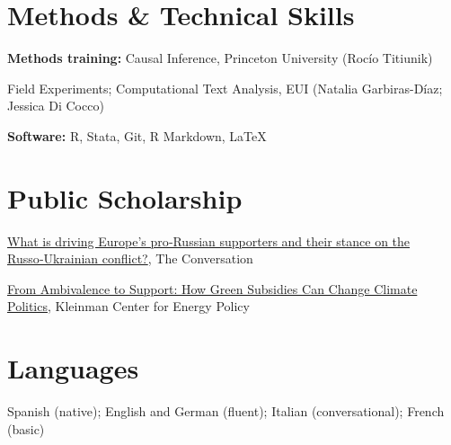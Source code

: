 \documentclass[11pt,a4paper]{article}
\newcommand{\dateditem}[2]{%
  \noindent
  \begin{minipage}[t]{0.80\linewidth}\vspace{0pt}\raggedright #1\end{minipage}\hfill%
  \begin{minipage}[t]{0.18\linewidth}\vspace{0pt}\raggedleft{\color{muted}#2}\end{minipage}\par
}
\newcommand{\simpleitem}[2]{%
  \dateditem{#1}{#2}\vspace{0.08em}
}
\begin{document}
\section{Methods \& Technical Skills}

\simpleitem{\textbf{Methods training:} Causal Inference, Princeton University (Roc\'io Titiunik)}{2024}
\simpleitem{Field Experiments; Computational Text Analysis, EUI (Natalia Garbiras-D\'iaz; Jessica Di Cocco)}{2023}
\textbf{Software:} R, Stata, Git, R Markdown, \LaTeX


\section{Public Scholarship}

\simpleitem{\href{https://theconversation.com/what-is-driving-europes-pro-russian-supporters-and-their-stance-on-the-russo-ukrainian-conflict-281598}{What is driving Europe's pro‑Russian supporters and their stance on the Russo‑Ukrainian conflict?}, The Conversation}{2026}
\simpleitem{\href{https://kleinmanenergy.upenn.edu/commentary/blog/insights-from-the-the-political-economy-of-climate-change-and-the-environment-2024-mini-conference/}{From Ambivalence to Support: How Green Subsidies Can Change Climate Politics}, Kleinman Center for Energy Policy}{2024}


\section{Languages}

Spanish (native); English and German (fluent); Italian (conversational); French (basic)
\end{document}
